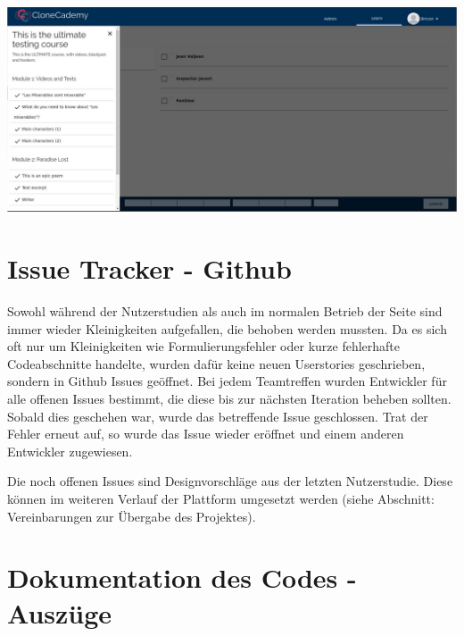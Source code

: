 \documentclass[accentcolor=tud0b,12pt,paper=a4]{tudreport}
\begin{document}
	\includegraphics[height=0.3\textheight]{appendix/screenshots/question-0.jpeg}


\chapter{Issue Tracker - Github}
Sowohl während der Nutzerstudien als auch im normalen Betrieb der Seite sind immer wieder Kleinigkeiten aufgefallen, die behoben werden mussten. Da es sich oft nur um Kleinigkeiten wie Formulierungsfehler oder kurze fehlerhafte Codeabschnitte handelte, wurden dafür keine neuen Userstories geschrieben, sondern in Github Issues geöffnet. Bei jedem Teamtreffen wurden Entwickler für alle offenen Issues bestimmt, die diese bis zur nächsten Iteration beheben sollten. Sobald dies geschehen war, wurde das betreffende Issue geschlossen. Trat der Fehler erneut auf, so wurde das Issue wieder eröffnet und einem anderen Entwickler zugewiesen.

Die noch offenen Issues sind Designvorschläge aus der letzten Nutzerstudie. Diese können im weiteren Verlauf der Plattform umgesetzt werden (siehe Abschnitt: Vereinbarungen zur Übergabe des Projektes).

	
	
	


\chapter{Dokumentation des Codes - Auszüge}
\end{document}
